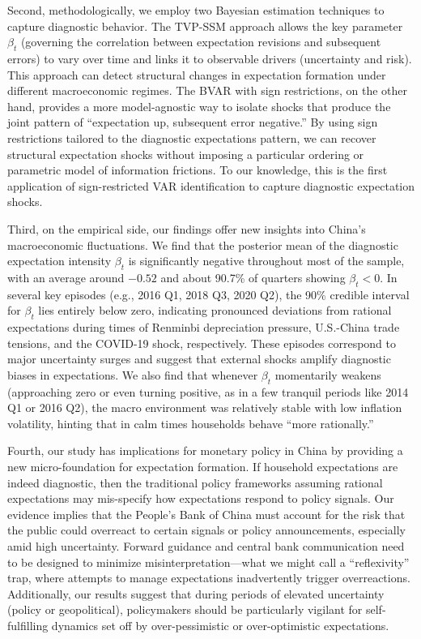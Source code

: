 \documentclass[12pt]{article}
\begin{document}
Second, methodologically, we employ two Bayesian estimation techniques to capture diagnostic behavior. The TVP-SSM approach allows the key parameter $\beta_t$ (governing the correlation between expectation revisions and subsequent errors) to vary over time and links it to observable drivers (uncertainty and risk). This approach can detect structural changes in expectation formation under different macroeconomic regimes. The BVAR with sign restrictions, on the other hand, provides a more model-agnostic way to isolate shocks that produce the joint pattern of “expectation up, subsequent error negative.” By using sign restrictions \cite{Uhlig2005} tailored to the diagnostic expectations pattern, we can recover structural expectation shocks without imposing a particular ordering or parametric model of information frictions. To our knowledge, this is the first application of sign-restricted VAR identification to capture diagnostic expectation shocks.

Third, on the empirical side, our findings offer new insights into China's macroeconomic fluctuations. We find that the posterior mean of the diagnostic expectation intensity $\beta_t$ is significantly negative throughout most of the sample, with an average around $-0.52$ and about 90.7\% of quarters showing $\beta_t<0$. In several key episodes (e.g., 2016 Q1, 2018 Q3, 2020 Q2), the 90\% credible interval for $\beta_t$ lies entirely below zero, indicating pronounced deviations from rational expectations during times of Renminbi depreciation pressure, U.S.-China trade tensions, and the COVID-19 shock, respectively. These episodes correspond to major uncertainty surges and suggest that external shocks amplify diagnostic biases in expectations. We also find that whenever $\beta_t$ momentarily weakens (approaching zero or even turning positive, as in a few tranquil periods like 2014 Q1 or 2016 Q2), the macro environment was relatively stable with low inflation volatility, hinting that in calm times households behave “more rationally.”

Fourth, our study has implications for monetary policy in China by providing a new micro-foundation for expectation formation. If household expectations are indeed diagnostic, then the traditional policy frameworks assuming rational expectations may mis-specify how expectations respond to policy signals. Our evidence implies that the People's Bank of China must account for the risk that the public could overreact to certain signals or policy announcements, especially amid high uncertainty. Forward guidance and central bank communication need to be designed to minimize misinterpretation—what we might call a “reflexivity” trap, where attempts to manage expectations inadvertently trigger overreactions. Additionally, our results suggest that during periods of elevated uncertainty (policy or geopolitical), policymakers should be particularly vigilant for self-fulfilling dynamics set off by over-pessimistic or over-optimistic expectations.
\end{document}
